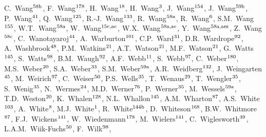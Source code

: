 \begin{flushleft}
C.~Wang$^\textrm{\scriptsize 58b}$,    
F.~Wang$^\textrm{\scriptsize 178}$,    
H.~Wang$^\textrm{\scriptsize 18}$,    
H.~Wang$^\textrm{\scriptsize 3}$,    
J.~Wang$^\textrm{\scriptsize 154}$,    
J.~Wang$^\textrm{\scriptsize 59b}$,    
P.~Wang$^\textrm{\scriptsize 41}$,    
Q.~Wang$^\textrm{\scriptsize 125}$,    
R.-J.~Wang$^\textrm{\scriptsize 133}$,    
R.~Wang$^\textrm{\scriptsize 58a}$,    
R.~Wang$^\textrm{\scriptsize 6}$,    
S.M.~Wang$^\textrm{\scriptsize 155}$,    
W.T.~Wang$^\textrm{\scriptsize 58a}$,    
W.~Wang$^\textrm{\scriptsize 15c,ae}$,    
W.X.~Wang$^\textrm{\scriptsize 58a,ae}$,    
Y.~Wang$^\textrm{\scriptsize 58a,am}$,    
Z.~Wang$^\textrm{\scriptsize 58c}$,    
C.~Wanotayaroj$^\textrm{\scriptsize 44}$,    
A.~Warburton$^\textrm{\scriptsize 101}$,    
C.P.~Ward$^\textrm{\scriptsize 31}$,    
D.R.~Wardrope$^\textrm{\scriptsize 92}$,    
A.~Washbrook$^\textrm{\scriptsize 48}$,    
P.M.~Watkins$^\textrm{\scriptsize 21}$,    
A.T.~Watson$^\textrm{\scriptsize 21}$,    
M.F.~Watson$^\textrm{\scriptsize 21}$,    
G.~Watts$^\textrm{\scriptsize 145}$,    
S.~Watts$^\textrm{\scriptsize 98}$,    
B.M.~Waugh$^\textrm{\scriptsize 92}$,    
A.F.~Webb$^\textrm{\scriptsize 11}$,    
S.~Webb$^\textrm{\scriptsize 97}$,    
C.~Weber$^\textrm{\scriptsize 180}$,    
M.S.~Weber$^\textrm{\scriptsize 20}$,    
S.A.~Weber$^\textrm{\scriptsize 33}$,    
S.M.~Weber$^\textrm{\scriptsize 59a}$,    
A.R.~Weidberg$^\textrm{\scriptsize 132}$,    
J.~Weingarten$^\textrm{\scriptsize 45}$,    
M.~Weirich$^\textrm{\scriptsize 97}$,    
C.~Weiser$^\textrm{\scriptsize 50}$,    
P.S.~Wells$^\textrm{\scriptsize 35}$,    
T.~Wenaus$^\textrm{\scriptsize 29}$,    
T.~Wengler$^\textrm{\scriptsize 35}$,    
S.~Wenig$^\textrm{\scriptsize 35}$,    
N.~Wermes$^\textrm{\scriptsize 24}$,    
M.D.~Werner$^\textrm{\scriptsize 76}$,    
P.~Werner$^\textrm{\scriptsize 35}$,    
M.~Wessels$^\textrm{\scriptsize 59a}$,    
T.D.~Weston$^\textrm{\scriptsize 20}$,    
K.~Whalen$^\textrm{\scriptsize 128}$,    
N.L.~Whallon$^\textrm{\scriptsize 145}$,    
A.M.~Wharton$^\textrm{\scriptsize 87}$,    
A.S.~White$^\textrm{\scriptsize 103}$,    
A.~White$^\textrm{\scriptsize 8}$,    
M.J.~White$^\textrm{\scriptsize 1}$,    
R.~White$^\textrm{\scriptsize 144b}$,    
D.~Whiteson$^\textrm{\scriptsize 168}$,    
B.W.~Whitmore$^\textrm{\scriptsize 87}$,    
F.J.~Wickens$^\textrm{\scriptsize 141}$,    
W.~Wiedenmann$^\textrm{\scriptsize 178}$,    
M.~Wielers$^\textrm{\scriptsize 141}$,    
C.~Wiglesworth$^\textrm{\scriptsize 39}$,    
L.A.M.~Wiik-Fuchs$^\textrm{\scriptsize 50}$,    
F.~Wilk$^\textrm{\scriptsize 98}$,    

\end{flushleft}
